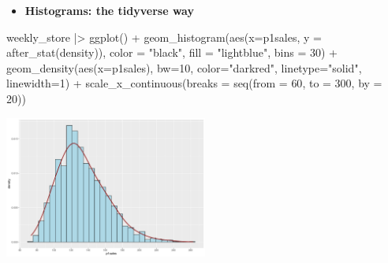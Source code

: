 \documentclass[
  ignorenonframetext,
]{beamer}
\newenvironment{Shaded}{\begin{snugshade}}{\end{snugshade}}
\newcommand{\AttributeTok}[1]{\textcolor[rgb]{0.40,0.45,0.13}{#1}}
\newcommand{\DecValTok}[1]{\textcolor[rgb]{0.68,0.00,0.00}{#1}}
\newcommand{\FunctionTok}[1]{\textcolor[rgb]{0.28,0.35,0.67}{#1}}
\newcommand{\NormalTok}[1]{\textcolor[rgb]{0.00,0.23,0.31}{#1}}
\newcommand{\SpecialCharTok}[1]{\textcolor[rgb]{0.37,0.37,0.37}{#1}}
\newcommand{\StringTok}[1]{\textcolor[rgb]{0.13,0.47,0.30}{#1}}
\providecommand{\tightlist}{%
  \setlength{\itemsep}{0pt}\setlength{\parskip}{0pt}}\usepackage{longtable,booktabs,array}
\begin{document}
\begin{frame}[fragile]{}
\label{section-20}
\begin{itemize}
\tightlist
\item
  \textbf{Histograms: the tidyverse way}
\end{itemize}

\tiny

\begin{Shaded}
\begin{Highlighting}[]
\NormalTok{weekly\_store }\SpecialCharTok{|\textgreater{}} \FunctionTok{ggplot}\NormalTok{() }\SpecialCharTok{+} 
  \FunctionTok{geom\_histogram}\NormalTok{(}\FunctionTok{aes}\NormalTok{(}\AttributeTok{x=}\NormalTok{p1sales, }\AttributeTok{y =} \FunctionTok{after\_stat}\NormalTok{(density)),}
                 \AttributeTok{color =} \StringTok{"black"}\NormalTok{, }\AttributeTok{fill =} \StringTok{"lightblue"}\NormalTok{, }\AttributeTok{bins =} \DecValTok{30}\NormalTok{) }\SpecialCharTok{+}
  \FunctionTok{geom\_density}\NormalTok{(}\FunctionTok{aes}\NormalTok{(}\AttributeTok{x=}\NormalTok{p1sales),}
               \AttributeTok{bw=}\DecValTok{10}\NormalTok{, }\AttributeTok{color=}\StringTok{"darkred"}\NormalTok{, }\AttributeTok{linetype=}\StringTok{"solid"}\NormalTok{, }\AttributeTok{linewidth=}\DecValTok{1}\NormalTok{) }\SpecialCharTok{+} 
  \FunctionTok{scale\_x\_continuous}\NormalTok{(}\AttributeTok{breaks =} \FunctionTok{seq}\NormalTok{(}\AttributeTok{from =} \DecValTok{60}\NormalTok{, }\AttributeTok{to =} \DecValTok{300}\NormalTok{, }\AttributeTok{by =} \DecValTok{20}\NormalTok{))}
\end{Highlighting}
\end{Shaded}

\begin{center}
\includegraphics[width=0.5\textwidth,height=\textheight]{003_describing_data_files/figure-beamer/unnamed-chunk-19-1.pdf}
\end{center}
\end{frame}
\end{document}
